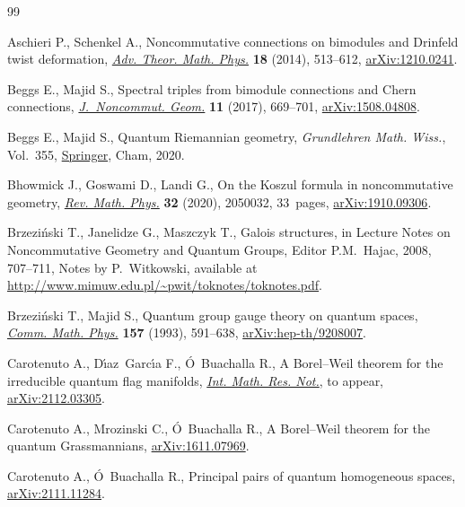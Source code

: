 \documentclass[10pt,a4paper]{amsart}
\numberwithin{equation}{section}
\begin{document}
\begin{thebibliography}{99}
\footnotesize\itemsep=0pt

Aschieri P., Schenkel A., Noncommutative connections on bimodules and
 {D}rinfeld twist deformation, \href{https://doi.org/10.4310/ATMP.2014.v18.n3.a1}{\textit{Adv. Theor. Math. Phys.}} \textbf{18}
 (2014), 513--612, \href{https://arxiv.org/abs/1210.0241}{arXiv:1210.0241}.

Beggs E., Majid S., Spectral triples from bimodule connections and {C}hern
 connections, \href{https://doi.org/10.4171/JNCG/11-2-7}{\textit{J.~Noncommut. Geom.}} \textbf{11} (2017), 669--701,
 \href{https://arxiv.org/abs/1508.04808}{arXiv:1508.04808}.

Beggs E., Majid S., Quantum {R}iemannian geometry, \textit{Grundlehren Math.
 Wiss.}, Vol.~355, \href{https://doi.org/10.1007/978-3-030-30294-8}{Springer}, Cham, 2020.

Bhowmick J., Goswami D., Landi G., On the {K}oszul formula in noncommutative
 geometry, \href{https://doi.org/10.1142/S0129055X20500324}{\textit{Rev. Math. Phys.}} \textbf{32} (2020), 2050032, 33~pages,
 \href{https://arxiv.org/abs/1910.09306}{arXiv:1910.09306}.

Brzezi\'nski T., Janelidze G., Maszczyk T., Galois structures, in Lecture Notes
 on Noncommutative Geometry and Quantum Groups, Editor P.M.~Hajac, 2008,
 707--711, {N}otes by P.~Witkowski, available at
 \url{http://www.mimuw.edu.pl/~pwit/toknotes/toknotes.pdf}.

Brzezi\'nski T., Majid S., Quantum group gauge theory on quantum spaces,
 \href{https://doi.org/10.1007/BF02096884}{\textit{Comm. Math. Phys.}} \textbf{157} (1993), 591--638,
 \href{https://arxiv.org/abs/hep-th/9208007}{arXiv:hep-th/9208007}.

Carotenuto A., D\'{\i}az~Garc\'{\i}a F., \'O~Buachalla R., A {B}orel--{W}eil
 theorem for the irreducible quantum flag manifolds, \href{https://doi.org/10.1093/imrn/rnac193}{\textit{Int. Math. Res.
 Not.}}, {t}o appear, \href{https://arxiv.org/abs/2112.03305}{arXiv:2112.03305}.

Carotenuto A., Mrozinski C., \'O~Buachalla R., A {B}orel--{W}eil theorem for
 the quantum {G}rassmannians, \href{https://arxiv.org/abs/1611.07969}{arXiv:1611.07969}.

Carotenuto A., \'O~Buachalla R., Principal pairs of quantum homogeneous spaces,
 \href{https://arxiv.org/abs/2111.11284}{arXiv:2111.11284}.


\end{thebibliography}
\end{document}
